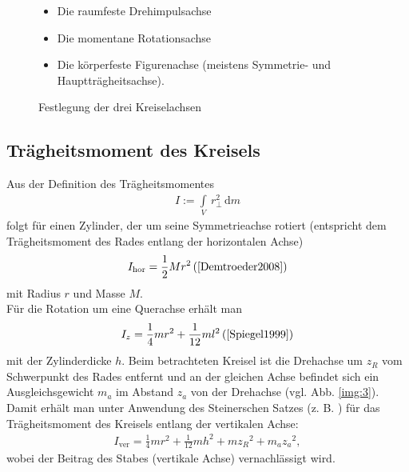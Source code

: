 \begin{figure}[ht]
\begin{minipage}[c]{0.45\linewidth}
\begin{itemize}
\item Die raumfeste Drehimpulsachse
\item Die momentane Rotationsachse
\item Die körperfeste Figurenachse (meistens Symmetrie- und Hauptträgheitsachse).
\end{itemize}
\end{minipage}
\hspace{0.5cm}
\begin{minipage}[c]{0.45\linewidth}
\centering
\resizebox{\textwidth}{!}{}
\caption{Festlegung der drei Kreiselachsen}
\label{img:1}
\end{minipage}
\end{figure}
%
\subsection{Trägheitsmoment des Kreisels}
Aus der Definition des Trägheitsmomentes
\begin{align}
I:=\int\limits_{V} \, r^2_{\perp}\, \mathrm{d}m
\end{align}
folgt für einen Zylinder, der um seine Symmetrieachse rotiert (entspricht dem Trägheitsmoment des Rades entlang der horizontalen Achse)
\begin{align}
	I_{\text{hor}}=\frac{1}{2}Mr^2\, \text{(\cite{Demtroeder2008})}
	\label{eq:5}
\end{align}
mit Radius $r$ und Masse $M$.\\
Für die Rotation um eine Querachse erhält man
\begin{align}
	I_z=\frac{1}{4}mr^2+\frac{1}{12}ml^2\, \text{(\cite{Spiegel1999})}
\end{align}
mit der Zylinderdicke $h$. Beim betrachteten Kreisel ist die Drehachse um $z_R$ vom Schwerpunkt des Rades entfernt und an der gleichen Achse befindet sich ein Ausgleichsgewicht $m_a$ im Abstand $z_a$ von der Drehachse (vgl. Abb. \ref{img:3}). Damit erhält man unter Anwendung des Steinerschen Satzes (z. B. \cite{Nolting2011}) für das Trägheitsmoment des Kreisels entlang der vertikalen Achse:
\begin{align}
	I_{\text{ver}}=\frac{1}{4}mr^2+\frac{1}{12}mh^2+m{z_R}^2+m_a{z_a}^2,
	\label{eq:6}
\end{align}
wobei der Beitrag des Stabes (vertikale Achse) vernachlässigt wird.
%
